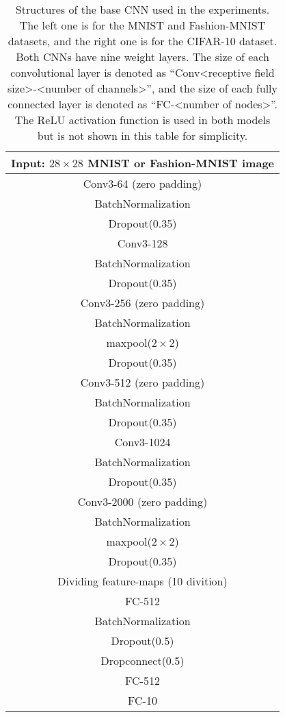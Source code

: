 \documentclass[a4j]{article}
\begin{document}
\begin{table}[t]
  \centering
\caption{Structures of the base CNN used in the experiments. The left one is for the MNIST and Fashion-MNIST datasets, and the right one is for the CIFAR-10 dataset. Both CNNs have nine weight layers. The size of each convolutional layer is denoted as ``Conv<receptive field size>-<number of channels>'', and the size of each fully connected layer is denoted as ``FC-<number of nodes>''. The ReLU activation function is used in both models but is not shown in this table for simplicity. } 
    \label{tb:mainnet}
    \begin{tabular}[t]{|c|} \hline
      Input: $28\times28$ MNIST or Fashion-MNIST image\\ \hline
      Conv3-64 (zero padding)\\
      BatchNormalization\\
      Dropout(0.35)\\
      Conv3-128\\
      BatchNormalization\\
      Dropout(0.35)\\
      Conv3-256 (zero padding)\\
      BatchNormalization\\ \hline
      maxpool($2\times2$)\\ \hline
      Dropout(0.35)\\
      Conv3-512 (zero padding)\\
      BatchNormalization\\
      Dropout(0.35)\\
      Conv3-1024\\
      BatchNormalization\\
      Dropout(0.35)\\
      Conv3-2000 (zero padding)\\
      BatchNormalization\\ \hline
      maxpool($2\times2$)\\ \hline
      Dropout(0.35)\\ \hline\hline
      Dividing feature-maps (10 divition)\\ \hline\hline
      FC-512\\
      BatchNormalization\\
      Dropout(0.5)\\ \hline
      Dropconnect(0.5) \cite{Dropconnect, ChainerDropconnect} \\
FC-512\\ \hline
      FC-10\\ \hline

\end{tabular}
\end{table}
\end{document}
